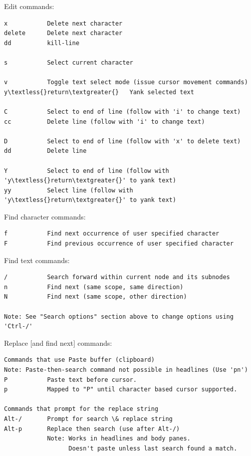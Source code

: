 \documentclass[a4paper,10pt,english]{sphinxmanual}
\begin{document}
Edit commands:

\begin{Verbatim}[commandchars=\\\{\}]
x           Delete next character
delete      Delete next character
dd          kill-line

s           Select current character

v           Toggle text select mode (issue cursor movement commands)
y\textless{}return\textgreater{}   Yank selected text

C           Select to end of line (follow with 'i' to change text)
cc          Delete line (follow with 'i' to change text)

D           Select to end of line (follow with 'x' to delete text)
dd          Delete line

Y           Select to end of line (follow with 'y\textless{}return\textgreater{}' to yank text)
yy          Select line (follow with 'y\textless{}return\textgreater{}' to yank text)
\end{Verbatim}

Find character commands:

\begin{Verbatim}[commandchars=\\\{\}]
f           Find next occurrence of user specified character
F           Find previous occurrence of user specified character
\end{Verbatim}

Find text commands:

\begin{Verbatim}[commandchars=\\\{\}]
/           Search forward within current node and its subnodes
n           Find next (same scope, same direction)
N           Find next (same scope, other direction)

Note: See "Search options" section above to change options using 'Ctrl-/'
\end{Verbatim}

Replace {[}and find next{]} commands:

\begin{Verbatim}[commandchars=\\\{\}]
Commands that use Paste buffer (clipboard)
Note: Paste-then-search command not possible in headlines (Use 'pn')
P           Paste text before cursor.
p           Mapped to "P" until character based cursor supported.

Commands that prompt for the replace string
Alt-/       Prompt for search \& replace string
Alt-p       Replace then search (use after Alt-/)
            Note: Works in headlines and body panes.
                  Doesn't paste unless last search found a match.
\end{Verbatim}
\end{document}
